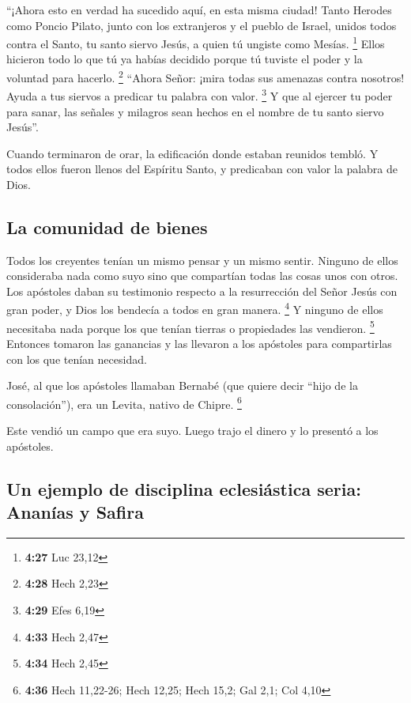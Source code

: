 ``¡Ahora esto en verdad ha sucedido aquí, en esta misma
ciudad! Tanto Herodes como Poncio Pilato, junto con los extranjeros y el
pueblo de Israel, unidos todos contra el Santo, tu santo siervo Jesús, a
quien tú ungiste como Mesías. \footnote{\textbf{4:27} Luc 23,12}
 Ellos hicieron todo lo que tú ya habías decidido porque
tú tuviste el poder y la voluntad para hacerlo. \footnote{\textbf{4:28}
  Hech 2,23}  ``Ahora Señor: ¡mira todas sus amenazas
contra nosotros! Ayuda a tus siervos a predicar tu palabra con valor.
\footnote{\textbf{4:29} Efes 6,19}  Y que al ejercer tu
poder para sanar, las señales y milagros sean hechos en el nombre de tu
santo siervo Jesús''.

 Cuando terminaron de orar, la edificación donde estaban
reunidos tembló. Y todos ellos fueron llenos del Espíritu Santo, y
predicaban con valor la palabra de Dios.

\hypertarget{la-comunidad-de-bienes}{%
\subsection{La comunidad de bienes}\label{la-comunidad-de-bienes}}

 Todos los creyentes tenían un mismo pensar y un mismo
sentir. Ninguno de ellos consideraba nada como suyo sino que compartían
todas las cosas unos con otros.  Los apóstoles daban su
testimonio respecto a la resurrección del Señor Jesús con gran poder, y
Dios los bendecía a todos en gran manera. \footnote{\textbf{4:33} Hech
  2,47}  Y ninguno de ellos necesitaba nada porque los
que tenían tierras o propiedades las vendieron. \footnote{\textbf{4:34}
  Hech 2,45}  Entonces tomaron las ganancias y las
llevaron a los apóstoles para compartirlas con los que tenían necesidad.

 José, al que los apóstoles llamaban Bernabé (que quiere
decir ``hijo de la consolación''), era un Levita, nativo de Chipre.
\footnote{\textbf{4:36} Hech 11,22-26; Hech 12,25; Hech 15,2; Gal 2,1;
  Col 4,10}

 Este vendió un campo que era suyo. Luego trajo el dinero
y lo presentó a los apóstoles.

\hypertarget{un-ejemplo-de-disciplina-eclesiuxe1stica-seria-ananuxedas-y-safira}{%
\subsection{Un ejemplo de disciplina eclesiástica seria: Ananías y
Safira}\label{un-ejemplo-de-disciplina-eclesiuxe1stica-seria-ananuxedas-y-safira}}


